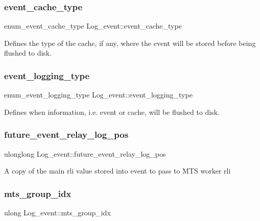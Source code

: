 \subsubsection{\texorpdfstring{event\+\_\+cache\+\_\+type}{event\_cache\_type}}
{\footnotesize\ttfamily enum\+\_\+event\+\_\+cache\+\_\+type Log\+\_\+event\+::event\+\_\+cache\+\_\+type}

Defines the type of the cache, if any, where the event will be stored before being flushed to disk. \mbox{\label{classLog__event_ac72fee64ecfbb10396489f82fc28ed1d}} 
\subsubsection{\texorpdfstring{event\+\_\+logging\+\_\+type}{event\_logging\_type}}
{\footnotesize\ttfamily enum\+\_\+event\+\_\+logging\+\_\+type Log\+\_\+event\+::event\+\_\+logging\+\_\+type}

Defines when information, i.\+e. event or cache, will be flushed to disk. \mbox{\label{classLog__event_a6c443026bb826f7743d090ec1a5dec40}} 
\subsubsection{\texorpdfstring{future\+\_\+event\+\_\+relay\+\_\+log\+\_\+pos}{future\_event\_relay\_log\_pos}}
{\footnotesize\ttfamily ulonglong Log\+\_\+event\+::future\+\_\+event\+\_\+relay\+\_\+log\+\_\+pos}

A copy of the main rli value stored into event to pass to M\+TS worker rli \mbox{\label{classLog__event_a0c7bd9c306af3c715de88e246241db9b}} 
\subsubsection{\texorpdfstring{mts\+\_\+group\+\_\+idx}{mts\_group\_idx}}
{\footnotesize\ttfamily ulong Log\+\_\+event\+::mts\+\_\+group\+\_\+idx}

